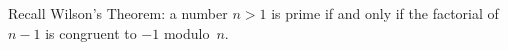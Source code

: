 \documentclass{article}
\begin{document}
Recall Wilson’s Theorem: 
a number \( n>1 \) is prime if and only if the factorial of \( n-1 \)
is congruent to \( -1 \) modulo~\( n \).

\printindex
\end{document}
